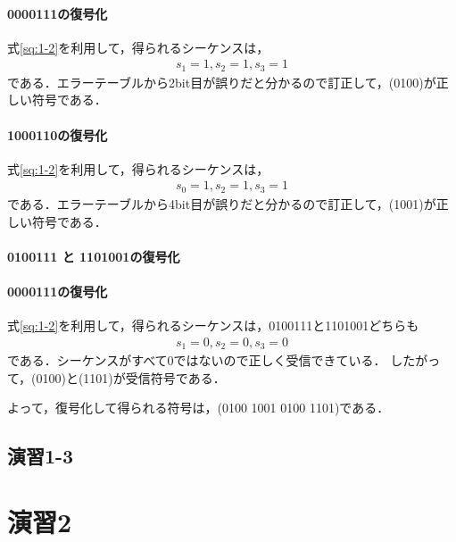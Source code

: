 \documentclass[documentclass]{jsarticle}
\begin{document}
\paragraph*{0000111の復号化}
式\ref*{sq:1-2}を利用して，得られるシーケンスは，
\begin{align*}
  s_1 = 1, s_2 = 1, s_3 = 1
\end{align*}
である．エラーテーブルから2bit目が誤りだと分かるので訂正して，(0100)が正しい符号である．

\paragraph*{1000110の復号化}
式\ref*{sq:1-2}を利用して，得られるシーケンスは，
\begin{align*}
  s_0 = 1, s_2 = 1, s_3 = 1
\end{align*}
である．エラーテーブルから4bit目が誤りだと分かるので訂正して，(1001)が正しい符号である．

\paragraph*{0100111 と 1101001の復号化}
\paragraph*{0000111の復号化}
式\ref*{sq:1-2}を利用して，得られるシーケンスは，0100111と1101001どちらも
\begin{align*}
  s_1 = 0, s_2 = 0, s_3 = 0
\end{align*}
である．シーケンスがすべて0ではないので正しく受信できている．
したがって，(0100)と(1101)が受信符号である．

よって，復号化して得られる符号は，(0100 1001 0100 1101)である．

\subsection*{演習1-3}

\newpage

\section*{演習2}
\end{document}
